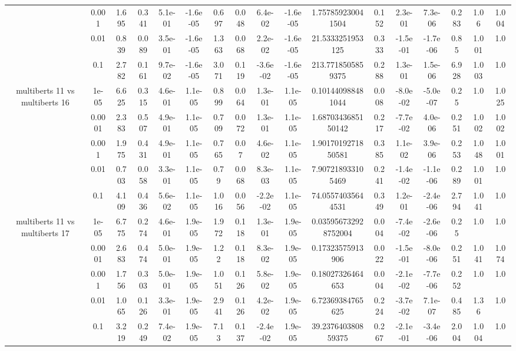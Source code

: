 \begin{tabular}{|c|c|c|c|c|c|c|c|c|c|c|c|c|c|c|c|c|}
 & 0.001 & 1.695 & 0.341 & 5.1e-01 & -1.6e-05 & 0.697 & 0.048 & 6.4e-02 & -1.6e-05 & 1.757859230041504 & 0.152 & 2.3e-01 & 7.3e-06 & 0.283 & 1.06 & 1.004 \\
 & 0.01 & 0.839 & 0.089 & 3.5e-01 & -1.6e-05 & 1.363 & 0.068 & 2.2e-02 & -1.6e-05 & 21.5333251953125 & 0.333 & -1.5e-01 & -1.7e-06 & 0.85 & 1.001 & 1.0 \\
 & 0.1 & 2.782 & 0.161 & 9.7e-02 & -1.6e-05 & 3.071 & 0.119 & -3.6e-02 & -1.6e-05 & 213.7718505859375 & 0.288 & 1.3e-01 & 1.5e-06 & 6.928 & 1.003 & 1.0 \\
\hline
\multirow{5}{*}{multiberts 11 vs multiberts 16} & 1e-05 & 6.625 & 0.315 & 4.6e-01 & 1.1e-05 & 0.899 & 0.064 & 1.3e-01 & 1.1e-05 & 0.101440988481044 & 0.008 & -8.0e-02 & -5.0e-07 & 0.25 & 1.0 & 1.025 \\
 & 0.0001 & 2.383 & 0.507 & 4.9e-01 & 1.1e-05 & 0.709 & 0.072 & 1.3e-01 & 1.1e-05 & 1.6870343685150142 & 0.217 & -7.7e-02 & 4.0e-06 & 0.251 & 1.002 & 1.002 \\
 & 0.001 & 1.975 & 0.431 & 4.9e-01 & 1.1e-05 & 0.765 & 0.07 & 4.6e-02 & 1.1e-05 & 1.9017019271850581 & 0.385 & 1.1e-02 & 3.9e-06 & 0.253 & 1.048 & 1.001 \\
 & 0.01 & 0.703 & 0.058 & 3.3e-01 & 1.1e-05 & 0.79 & 0.068 & 8.3e-03 & 1.1e-05 & 7.907218933105469 & 0.241 & -1.4e-02 & -1.1e-06 & 0.289 & 1.001 & 1.0 \\
 & 0.1 & 4.109 & 0.436 & 5.6e-02 & 1.1e-05 & 1.016 & 0.056 & -2.2e-02 & 1.1e-05 & 74.05574035644531 & 0.349 & 1.2e-01 & -2.4e-06 & 2.794 & 1.041 & 1.0 \\
\hline
\multirow{5}{*}{multiberts 11 vs multiberts 17} & 1e-05 & 6.775 & 0.274 & 4.6e-01 & 1.9e-05 & 1.972 & 0.118 & 1.3e-01 & 1.9e-05 & 0.035956732928752004 & 0.004 & -7.4e-02 & -2.6e-06 & 0.25 & 1.0 & 1.0 \\
 & 0.0001 & 2.683 & 0.474 & 5.0e-01 & 1.9e-05 & 1.22 & 0.118 & 8.3e-02 & 1.9e-05 & 0.17323575913906 & 0.022 & -1.5e-01 & -8.0e-06 & 0.251 & 1.041 & 1.074 \\
 & 0.001 & 1.756 & 0.303 & 5.0e-01 & 1.9e-05 & 1.051 & 0.126 & 5.8e-02 & 1.9e-05 & 0.18027326464653 & 0.004 & -2.1e-02 & -7.7e-06 & 0.252 & 1.0 & 1.0 \\
 & 0.01 & 1.065 & 0.126 & 3.3e-01 & 1.9e-05 & 2.941 & 0.126 & 4.2e-02 & 1.9e-05 & 6.72369384765625 & 0.224 & -3.7e-02 & 7.1e-07 & 0.485 & 1.36 & 1.0 \\
 & 0.1 & 3.219 & 0.249 & 7.4e-02 & 1.9e-05 & 7.13 & 0.137 & -2.4e-02 & 1.9e-05 & 39.237640380859375 & 0.267 & -2.1e-01 & -3.4e-06 & 2.004 & 1.004 & 1.0 \\

\end{tabular}
